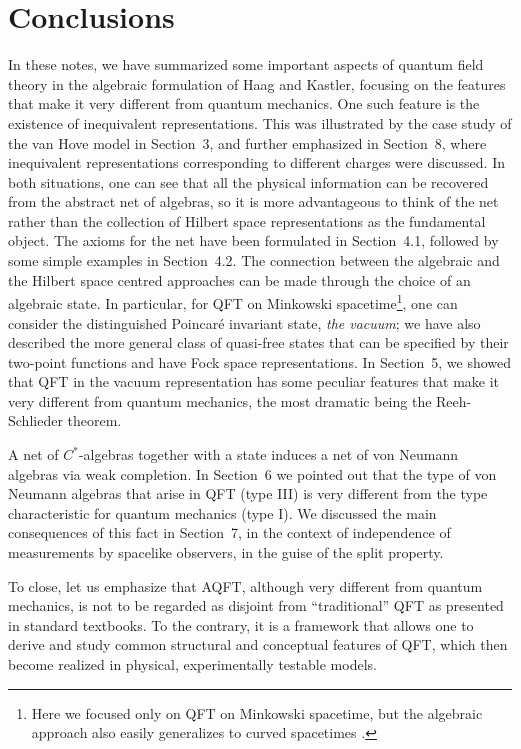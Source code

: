 \documentclass[12pt,a4paper]{article}
\newcommand{\1}{\mathds{1}}                         %
\begin{document}
\section{Conclusions}
In these notes, we have summarized some important aspects of quantum field theory in the algebraic formulation of Haag and Kastler, focusing on the features that make it very different from quantum mechanics. One such feature is the existence of inequivalent representations. This was illustrated by the case study of the van Hove model in Section~3, and further emphasized in Section~8, where inequivalent representations corresponding to different charges were discussed. In both situations, one can see that all the physical information can be recovered from the abstract net of algebras, so it is more advantageous to think of the net rather than the collection of Hilbert space representations as the fundamental object. The axioms for the net have been formulated in Section~4.1, followed by some simple examples in Section~4.2. The connection between the algebraic and the Hilbert space centred approaches can be made through the choice of an algebraic state. In particular, for QFT on Minkowski spacetime\footnote{Here we focused only on QFT on Minkowski spacetime, but the algebraic approach also easily generalizes to curved spacetimes \cite{BFV,FewVerchReview,JMPReview}.}, one can consider the distinguished Poincar{\'e} invariant state, \textit{the vacuum}; we have also described the more general class of quasi-free states that can be specified by their two-point functions and have Fock space representations. In Section~5, we showed that QFT in the vacuum representation has some peculiar features that make it very different from quantum mechanics, the most dramatic being the Reeh-Schlieder theorem. 

A net of $C^*$-algebras together with a state induces a net of von Neumann algebras via weak completion. In Section~6 we pointed out that the type of von Neumann algebras that arise in QFT (type III) is very different from the type characteristic for quantum mechanics (type I). We discussed the main consequences of this fact in Section~7, in the context of independence of measurements by spacelike observers, in the guise of the split property.

To close, let us emphasize that AQFT, although very different from quantum mechanics, is not
to be regarded as disjoint from ``traditional'' QFT as presented in standard textbooks. To the contrary, it is a framework that allows one to derive and study common structural and conceptual features of QFT, which then become realized in physical, experimentally testable models.
\end{document}
